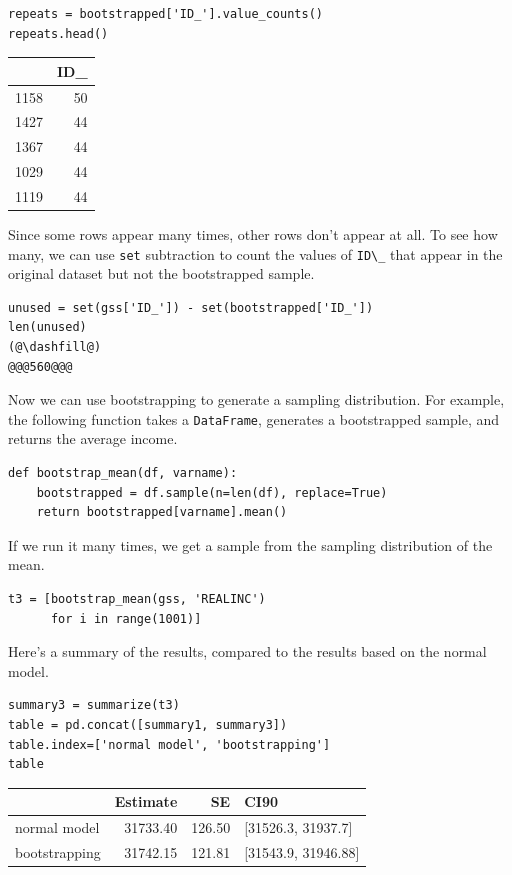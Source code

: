 \begin{lstlisting}[]
repeats = bootstrapped['ID_'].value_counts()
repeats.head()
\end{lstlisting}

\begin{tabular}{lr}
\midrule
{} &  ID\_ \\
\midrule
1158 &   50 \\
1427 &   44 \\
1367 &   44 \\
1029 &   44 \\
1119 &   44 \\
\midrule
\end{tabular}

Since some rows appear many times, other rows don't appear at all. To
see how many, we can use \passthrough{\lstinline!set!} subtraction to
count the values of \passthrough{\lstinline!ID\_!} that appear in the
original dataset but not the bootstrapped sample.

\begin{lstlisting}[]
unused = set(gss['ID_']) - set(bootstrapped['ID_'])
len(unused)
(@\dashfill@)
@@@560@@@
\end{lstlisting}

Now we can use bootstrapping to generate a sampling distribution. For
example, the following function takes a
\passthrough{\lstinline!DataFrame!}, generates a bootstrapped sample,
and returns the average income.

\begin{lstlisting}[]
def bootstrap_mean(df, varname):
    bootstrapped = df.sample(n=len(df), replace=True)
    return bootstrapped[varname].mean()
\end{lstlisting}

If we run it many times, we get a sample from the sampling distribution
of the mean.

\begin{lstlisting}[]
t3 = [bootstrap_mean(gss, 'REALINC')
      for i in range(1001)]
\end{lstlisting}

Here's a summary of the results, compared to the results based on the
normal model.

\begin{lstlisting}[]
summary3 = summarize(t3)
table = pd.concat([summary1, summary3])
table.index=['normal model', 'bootstrapping']
table
\end{lstlisting}

\begin{tabular}{lrrl}
\midrule
{} &  Estimate &      SE &                 CI90 \\
\midrule
normal model  &  31733.40 &  126.50 &   [31526.3, 31937.7] \\
bootstrapping &  31742.15 &  121.81 &  [31543.9, 31946.88] \\
\midrule
\end{tabular}

